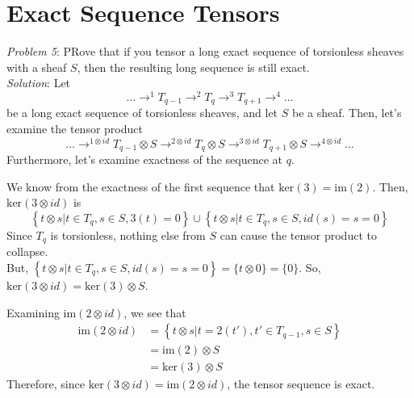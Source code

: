 \section{Exact Sequence Tensors}

\emph{Problem 5}: PRove that if you tensor a long exact sequence of torsionless
sheaves with a sheaf $S$, then the resulting long sequence is still exact.
\\

\emph{Solution}: Let
\[
\ldots \to^1 T_{q-1} \to^2 T_q \to^3 T_{q+1} \to^4 \ldots
\]
be a long exact sequence of torsionless sheaves, and let $S$ be a sheaf. Then,
let's examine the tensor product
\[
\ldots  \to^{1 \otimes id} T_{q-1} \otimes S 
        \to^{2 \otimes id} T_q \otimes S 
        \to^{3 \otimes id} T_{q+1} \otimes S
        \to^{4 \otimes id} \ldots
\]
Furthermore, let's examine exactness of the sequence at $q$.
\par
We know from the exactness of the first sequence that
$\text{ker}(3)=\text{im}(2)$.
Then, $\text{ker}(3\otimes id)$ is 
\[
\left\{t\otimes s | t \in T_q, s \in S, 3(t)
= 0\right\} \cup \left\{t \otimes s | t \in T_q, s \in S, id(s)=s=0\right\}
\]
Since $T_q$ is torsionless, nothing else from $S$ can cause the tensor product
to collapse.
\\
But, $\left\{t \otimes s | t \in T_q, s \in S, id(s)=s=0\right\} = 
    \{t\otimes 0\} = \{0\}$.
So, $\text{ker}(3\otimes id) = \text{ker}(3)\otimes S$.
\par
Examining $\text{im}(2\otimes id)$, we see that
\[
\begin{aligned}
\text{im}(2\otimes id) &= 
        \left\{t\otimes s | t = 2(t'), t' \in T_{q-1}, s \in S\right\} \\
                       &= \text{im}(2)\otimes S \\
                       &= \text{ker}(3) \otimes S
\end{aligned}
\]
Therefore, since $\text{ker}(3\otimes id) = \text{im}(2\otimes id)$, the tensor
sequence is exact.
